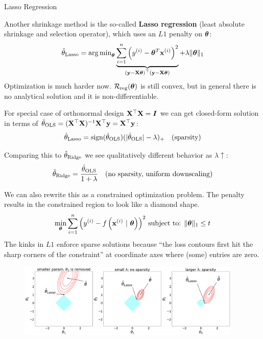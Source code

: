\documentclass[11pt,compress,t,notes=noshow, xcolor=table]{beamer}
\begin{document}

\begin{vbframe}{Lasso Regression}

Another shrinkage method is the so-called \textbf{Lasso regression} ({\scriptsize{least absolute shrinkage and selection operator}}), which uses an $L1$ penalty on $\bm{\theta}$:
\vspace{-0.2cm}
\begin{eqnarray*}
\hat{\theta}_{\text{Lasso}}= \operatorname{arg\,min}_{\bm{\theta}} \underbrace{\sum\limits_{i=1}^n \left(y^{(i)} - \bm{\theta}^T \mathbf{x}^{(i)}\right)^2}_{\left(\mathbf{y} - \mathbf{X} \bm{\theta}\right)^\top \left(\mathbf{y} - \mathbf{X} \bm{\theta}\right)} + \lambda \|\bm{\theta}\|_1
\end{eqnarray*}
Optimization is much harder now. $\mathcal{R}_{\text{reg}}(\bm{\theta})$ is still convex, but in general there is no analytical solution and it is non-differentiable.\\
\vspace{0.2cm}

For special case of orthonormal design $\mathbf{X}^{\top}\mathbf{X}=\boldsymbol{I}$ we can get closed-form solution in terms of $\hat{\theta}_{\text{OLS}}=(\mathbf{X}^{\top}\mathbf{X})^{-1}\mathbf{X}^{\top}\mathbf{y}=\mathbf{X}^{\top}\mathbf{y}$:
$$\hat{\theta}_{\text{Lasso}}=\text{sign}(\hat{\theta}_{\text{OLS}})(\vert \hat{\theta}_{\text{OLS}} \vert - \lambda)_{+}\quad(\text{sparsity})$$

Comparing this to $\hat{\theta}_{\text{Ridge}}$ we see qualitatively different behavior as $\lambda \uparrow$:
$$\hat{\theta}_{\text{Ridge}}=\frac{\hat{\theta}_{\text{OLS}}}{1+\lambda}\quad (\text{no sparsity, uniform downscaling})$$



\framebreak 

We can also rewrite this as a constrained optimization problem. The penalty results in the constrained region to look like a diamond shape.
\vspace{-0.2cm}
\begin{eqnarray*}
\min_{\bm{\theta}} \sum\limits_{i=1}^n \left(y^{(i)} - f\left(\mathbf{x}^{(i)} ~|~ \bm{\theta}\right)\right)^2\,
\text{subject to: } \|\bm{\theta}\|_1 \leq t
\end{eqnarray*}
The kinks in $L1$ enforce sparse solutions because ``the loss contours first hit the sharp corners of the constraint'' at coordinate axes where (some) entries are zero. 
\vspace{-0.1cm}
\begin{figure}%
\includegraphics[width=0.95\textwidth]{figure/lasso_contours_cases.png}\\
\end{figure}


\end{vbframe}
\end{document}
